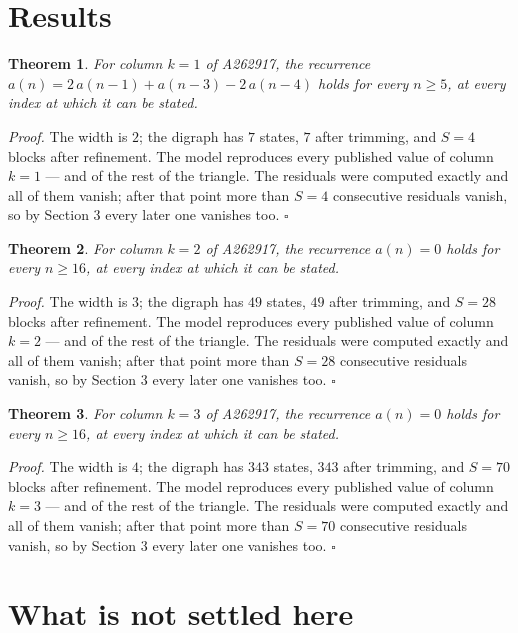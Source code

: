 \documentclass[11pt]{article}
\newtheorem{theorem}{Theorem}
\theoremstyle{definition}
\begin{document}
\section{Results}

\begin{theorem} For column $k = 1$ of A262917, the recurrence $a(n) = 2\,a(n-1) + a(n-3) - 2\,a(n-4)$ holds for every $n \ge 5$, at every index at which it can be stated.\end{theorem}

{\itshape Proof.} The width is $2$; the digraph has $7$ states, $7$ after trimming, and $S = 4$ blocks after refinement. The model reproduces every published value of column $k = 1$ --- and of the rest of the triangle. The residuals were computed exactly and all of them vanish; after that point more than $S = 4$ consecutive residuals vanish, so by Section 3 every later one vanishes too. $\square$

\begin{theorem} For column $k = 2$ of A262917, the recurrence $a(n) = 0$ holds for every $n \ge 16$, at every index at which it can be stated.\end{theorem}

{\itshape Proof.} The width is $3$; the digraph has $49$ states, $49$ after trimming, and $S = 28$ blocks after refinement. The model reproduces every published value of column $k = 2$ --- and of the rest of the triangle. The residuals were computed exactly and all of them vanish; after that point more than $S = 28$ consecutive residuals vanish, so by Section 3 every later one vanishes too. $\square$

\begin{theorem} For column $k = 3$ of A262917, the recurrence $a(n) = 0$ holds for every $n \ge 16$, at every index at which it can be stated.\end{theorem}

{\itshape Proof.} The width is $4$; the digraph has $343$ states, $343$ after trimming, and $S = 70$ blocks after refinement. The model reproduces every published value of column $k = 3$ --- and of the rest of the triangle. The residuals were computed exactly and all of them vanish; after that point more than $S = 70$ consecutive residuals vanish, so by Section 3 every later one vanishes too. $\square$

\section{What is not settled here}
\end{document}

